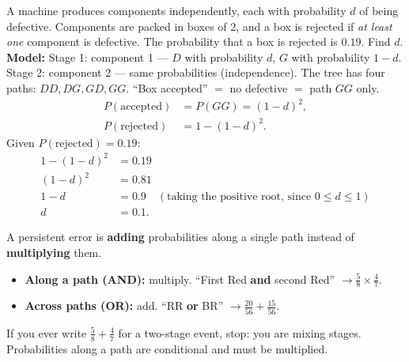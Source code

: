 \documentclass[11pt]{article}
\begin{document}
\begin{exoresolu}
A machine produces components independently, each with probability $d$ of being defective. Components are packed in boxes of 2, and a box is rejected if \emph{at least one} component is defective. The probability that a box is rejected is $0.19$. Find $d$.
\tcblower
\textbf{Model:} Stage 1: component 1 --- $D$ with probability $d$, $G$ with probability $1-d$. Stage 2: component 2 --- same probabilities (independence). The tree has four paths: $DD, DG, GD, GG$.
``Box accepted'' $=$ no defective $=$ path $GG$ only.
\begin{align*}
P(\text{accepted}) &= P(GG) = (1-d)^2,\\
P(\text{rejected}) &= 1 - (1-d)^2.
\end{align*}
Given $P(\text{rejected}) = 0.19$:
\begin{align*}
1 - (1-d)^2 &= 0.19\\
(1-d)^2 &= 0.81\\
1-d &= 0.9 \quad (\text{taking the positive root, since } 0 \le d \le 1)\\
d &= \mathbf{0.1}.
\end{align*}
\end{exoresolu}

\begin{attention}
A persistent error is \textbf{adding} probabilities along a single path instead of \textbf{multiplying} them.
\begin{itemize}
    \item \textbf{Along a path (AND):} multiply. ``First Red \textbf{and} second Red'' $\to \frac{5}{8} \times \frac{4}{7}$.
    \item \textbf{Across paths (OR):} add. ``RR \textbf{or} BR'' $\to \frac{20}{56} + \frac{15}{56}$.
\end{itemize}
If you ever write $\frac{5}{8} + \frac{4}{7}$ for a two-stage event, stop: you are mixing stages. Probabilities along a path are conditional and must be multiplied.
\end{attention}
\end{document}
